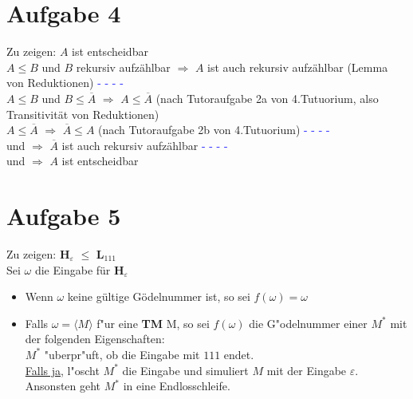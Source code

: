 \documentclass[a4paper,11pt]{scrartcl}
\begin{document}
	
\section*{Aufgabe 4}
Zu zeigen: $A$ ist entscheidbar \\
$A \le B$ und $B$ rekursiv aufz{\"a}hlbar $\Longrightarrow$ $A$ ist auch rekursiv aufz{\"a}hlbar (Lemma von Reduktionen) \textcolor{blue}{- - - - }\\
$A \le B$ und $B \le \overline{A}$ $\Longrightarrow$ $A \le \overline{A}$ (nach Tutoraufgabe 2a von 4.Tutuorium, also Transitivit{\"a}t von Reduktionen) \\
$A \le \overline{A}$ $\Longrightarrow$ $\overline{A} \le A$ (nach Tutoraufgabe 2b von 4.Tutuorium) \textcolor{blue}{- - - - }\\
\textcolor{blue}{} und \textcolor{blue}{ } $\Longrightarrow$ $ \overline{A}$ ist auch rekursiv aufz{\"a}hlbar  \textcolor{blue}{- - - -  }\\
\textcolor{blue}{} und \textcolor{blue}{} $\Longrightarrow$ $A$ ist entscheidbar 


 
\section*{Aufgabe 5}
\noindent Zu zeigen: $\textbf{H}_{\varepsilon}$ $\le$ $\textbf{L}_{111}$ \\
\noindent Sei $\omega$ die Eingabe f{\"u}r $\textbf{H}_{\varepsilon}$
\begin{itemize}
	\item Wenn $\omega$ keine g{\"u}ltige G{\"o}delnummer ist, so sei $f(\omega)=\omega$
	\item Falls $\omega=\langle M \rangle$ f"ur eine \textbf{TM} M, so sei $f(\omega)$ die G"odelnummer einer  $M^{*}$ mit der folgenden Eigenschaften:\\
	$M^{*}$ "uberpr"uft, ob die Eingabe mit $111$ endet.\\
	\underline{Falls ja}, l"oscht $M^{*}$ die Eingabe und simuliert $M$ mit der Eingabe $\varepsilon$. Ansonsten geht $M^*$ in eine Endlosschleife.
\end{itemize} 
\end{document}
